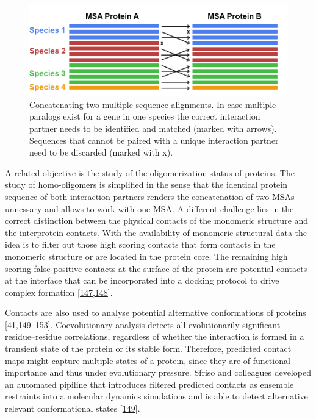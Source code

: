 \documentclass[11pt,a4paper,twoside]{book}
\theoremstyle{definition}
\theoremstyle{definition}
\theoremstyle{remark}
\begin{document}
\begin{figure}

{\centering \includegraphics[width=1\linewidth]{img/intro/matching_sequences_ppi} 

}

\caption{Concatenating two multiple sequence
alignments. In case multiple paralogs exist for a gene in one species
the correct interaction partner needs to be identified and matched
(marked with arrows). Sequences that cannot be paired with a unique
interaction partner need to be discarded (marked with x).}\label{fig:matching-sequences-ppi}
\end{figure}

A related objective is the study of the oligomerization status of
proteins. The study of homo-oligomers is simplified in the sense that
the identical protein sequence of both interaction partners renders the
concatenation of two \protect\hyperlink{abbrev}{MSAs} unnessary and
allows to work with one \protect\hyperlink{abbrev}{MSA}. A different
challenge lies in the correct distinction between the physical contacts
of the monomeric structure and the interprotein contacts. With the
availability of monomeric structural data the idea is to filter out
those high scoring contacts that form contacts in the monomeric
structure or are located in the protein core. The remaining high scoring
false positive contacts at the surface of the protein are potential
contacts at the interface that can be incorporated into a docking
protocol to drive complex formation
{[}\protect\hyperlink{ref-Uguzzoni2017}{147},\protect\hyperlink{ref-DosSantos2015a}{148}{]}.

Contacts are also used to analyse potential alternative conformations of
proteins
{[}\protect\hyperlink{ref-Parisi2015a}{41},\protect\hyperlink{ref-Sfriso2016}{149}--\protect\hyperlink{ref-Jeon2011a}{153}{]}.
Coevolutionary analysis detects all evolutionarily significant
residue--residue correlations, regardless of whether the interaction is
formed in a transient state of the protein or its stable form.
Therefore, predicted contact maps might capture multiple states of a
protein, since they are of functional importance and thus under
evolutionary pressure. Sfriso and colleagues developed an automated
pipiline that introduces filtered predicted contacts as ensemble
restraints into a molecular dynamics simulations and is able to detect
alternative relevant conformational states
{[}\protect\hyperlink{ref-Sfriso2016}{149}{]}.
\end{document}
